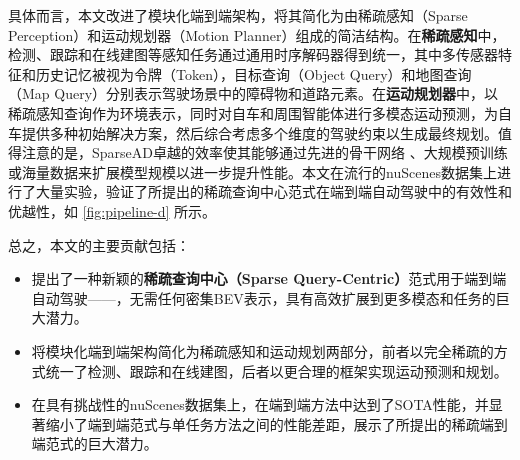 具体而言，本文改进了模块化端到端架构，将其简化为由稀疏感知（Sparse Perception）和运动规划器（Motion Planner）组成的简洁结构。在\textbf{稀疏感知}中，检测、跟踪和在线建图等感知任务通过通用时序解码器\cite{wang2023exploring}得到统一，其中多传感器特征和历史记忆被视为令牌（Token），目标查询（Object Query）和地图查询（Map Query）分别表示驾驶场景中的障碍物和道路元素。在\textbf{运动规划器}中，以稀疏感知查询作为环境表示，同时对自车和周围智能体进行多模态运动预测，为自车提供多种初始解决方案，然后综合考虑多个维度的驾驶约束以生成最终规划。值得注意的是，SparseAD卓越的效率使其能够通过先进的骨干网络 \cite{dosovitskiy2020image,liu2022convnet}、大规模预训练 \cite{fang2023eva,radford2021learning} 或海量数据来扩展模型规模以进一步提升性能。本文在流行的nuScenes数据集上进行了大量实验，验证了所提出的稀疏查询中心范式在端到端自动驾驶中的有效性和优越性，如 \cref{fig:pipeline-d} 所示。

总之，本文的主要贡献包括：
\begin{itemize}

\item 提出了一种新颖的\textbf{稀疏查询中心（Sparse Query-Centric）}范式用于端到端自动驾驶——\model，无需任何密集BEV表示，具有高效扩展到更多模态和任务的巨大潜力。

\item 将模块化端到端架构简化为稀疏感知和运动规划两部分，前者以完全稀疏的方式统一了检测、跟踪和在线建图，后者以更合理的框架实现运动预测和规划。

\item 在具有挑战性的nuScenes数据集\cite{caesar2020nuscenes}上，\model 在端到端方法中达到了SOTA性能，并显著缩小了端到端范式与单任务方法之间的性能差距，展示了所提出的稀疏端到端范式的巨大潜力。
\end{itemize}